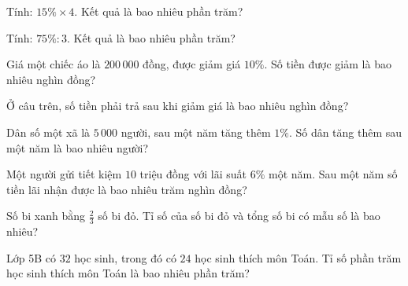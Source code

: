 \begin{ex}
  Tính: $15\% \times 4$. Kết quả là bao nhiêu phần trăm?
\end{ex}

\begin{ex}
  Tính: $75\% : 3$. Kết quả là bao nhiêu phần trăm?
\end{ex}

\begin{ex}
  Giá một chiếc áo là $200\,000$ đồng, được giảm giá $10\%$. Số tiền được giảm là bao nhiêu nghìn đồng?
\end{ex}

\begin{ex}
  Ở câu trên, số tiền phải trả sau khi giảm giá là bao nhiêu nghìn đồng?
\end{ex}

\begin{ex}
  Dân số một xã là $5\,000$ người, sau một năm tăng thêm $1\%$. Số dân tăng thêm sau một năm là bao nhiêu người?
\end{ex}

\begin{ex}
  Một người gửi tiết kiệm $10$ triệu đồng với lãi suất $6\%$ một năm. Sau một năm số tiền lãi nhận được là bao nhiêu trăm nghìn đồng?
\end{ex}

\begin{ex}
  Số bi xanh bằng $\frac{2}{3}$ số bi đỏ. Tỉ số của số bi đỏ và tổng số bi có mẫu số là bao nhiêu?
\end{ex}

\begin{ex}
  Lớp 5B có $32$ học sinh, trong đó có $24$ học sinh thích môn Toán. Tỉ số phần trăm học sinh thích môn Toán là bao nhiêu phần trăm?
\end{ex}
